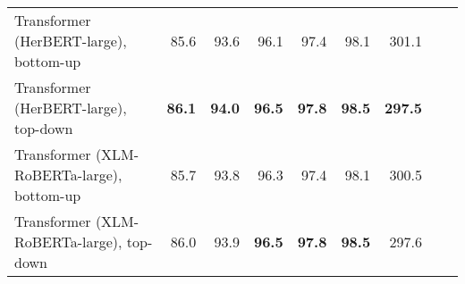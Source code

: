 \begin{table}[ht!]
{\begin{tabular}{lrrrrrrrr}
  Transformer (HerBERT-large), bottom-up & 85.6 & 93.6 & 96.1 & 97.4 & 98.1 & 301.1 \\ 
  Transformer (HerBERT-large), top-down & \textbf{86.1} & \textbf{94.0} & \textbf{96.5} & \textbf{97.8} & \textbf{98.5} & \textbf{297.5} \\ 
  Transformer (XLM-RoBERTa-large), bottom-up & 85.7 & 93.8 & 96.3 & 97.4 & 98.1 & 300.5 \\ 
  Transformer (XLM-RoBERTa-large), top-down & 86.0 & 93.9 & \textbf{96.5} & \textbf{97.8} & \textbf{98.5} & 297.6 \\ 
   \hline
\end{tabular}
}
\end{table}




